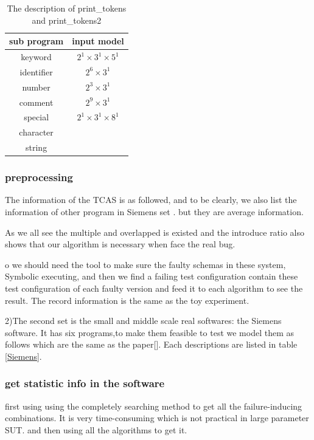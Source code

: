 \documentclass[10pt,journal,cspaper,compsoc]{IEEEtran}
\begin{document}
\begin{table}\renewcommand{\arraystretch}{1.3}
  \caption{The description of print\_tokens and print\_tokens2} \centering
  \label{printtokens}
  \begin{tabular}{c|c}\hline
  \hline
  \bfseries sub program &  \bfseries input model\\
  \hline
   keyword & $2^{1}\times3^{1}\times5^{1} $\\
   identifier & $2^{6}\times3^{1}$\\
   number & $2^{3}\times3^{1}$\\
   comment  & $2^{9}\times3^{1}$\\
   special & $2^{1}\times3^{1}\times8^{1} $\\
   character & $ $\\
   string &$ $\\
  \hline
  \end{tabular}

\end{table}

\subsubsection{preprocessing}


The information of the TCAS is as followed, and to be clearly, we also list the information of other program in Siemens set . but they are average information.

As we all see the multiple and overlapped is existed and the introduce ratio also shows that our algorithm is necessary when face the real bug.

o we should need the tool to make sure the faulty schemas in these system, Symbolic executing, and then we find a failing test configuration contain these test configuration of each faulty version and feed it to each algorithm to see the result. The record information is the same as the toy experiment.

2)The second set is the small and middle scale real softwares: the Siemens software. It has six programs,to make them feasible to test we model them as follows which are the same as the paper[]. Each descriptions are listed in table \ref{Siemens}.

\subsubsection{get statistic info in the software}
first using using the completely searching method to get all the failure-inducing combinations. It is very time-consuming which is not practical in large parameter SUT. and then using all the algorithms to get it.
\end{document}
